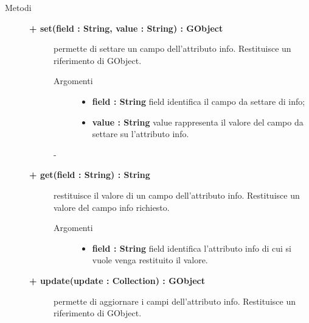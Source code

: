 \begin{description}
	
\item[Metodi] \hfill

	\begin{description}
		\item[\textbf{\color{blue}+ set(field : String, value : String) : GObject			}] \hfill
			permette di settare un campo dell'attributo info. Restituisce un riferimento di GObject.
			
		\begin{description}
			\item[Argomenti] \hfill
				\begin{itemize}
				
					\item \textbf{field : String			} \hfill
					field identifica il campo da settare di info;
					\item \textbf{value : String			} \hfill
					value rappresenta il valore del campo da settare su l'attributo info.
				\end{itemize}
		\end{description}-

\end{description}

\begin{description}
		\item[\textbf{\color{blue}+ get(field : String) : String			}] \hfill
			restituisce il valore di un campo dell'attributo info. Restituisce un valore del campo info richiesto.
			
		\begin{description}
			\item[Argomenti] \hfill
				\begin{itemize}
				
					\item \textbf{field : String			} \hfill
					field identifica l'attributo info di cui si vuole venga restituito il valore.
				\end{itemize}
		\end{description}

\end{description}

\begin{description}
		\item[\textbf{\color{blue}+ update(update : Collection) : GObject			}] \hfill
			permette di aggiornare i campi dell'attributo info. Restituisce un riferimento di GObject.
			

\end{description}
\end{description}
